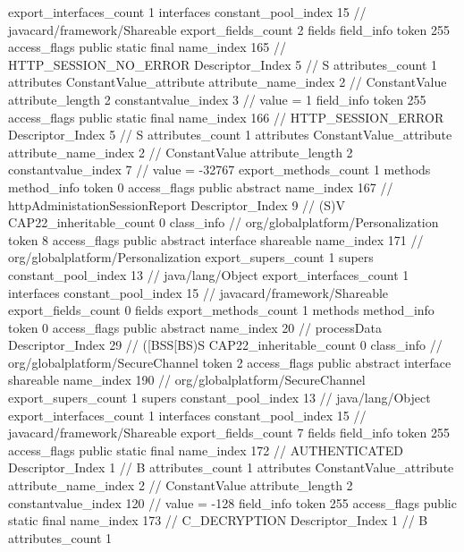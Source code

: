 {{{{			}
			export_interfaces_count	1
			interfaces {
				constant_pool_index	15		// javacard/framework/Shareable
			}
			export_fields_count	2
			fields {
			field_info {
				token	255
				access_flags	public static final
				name_index	165		// HTTP_SESSION_NO_ERROR
				Descriptor_Index	5		// S
				attributes_count	1
				attributes {
				ConstantValue_attribute {
					attribute_name_index	2		// ConstantValue
					attribute_length	2
					constantvalue_index	3		// value = 1
				}
				}
			}
			field_info {
				token	255
				access_flags	public static final
				name_index	166		// HTTP_SESSION_ERROR
				Descriptor_Index	5		// S
				attributes_count	1
				attributes {
				ConstantValue_attribute {
					attribute_name_index	2		// ConstantValue
					attribute_length	2
					constantvalue_index	7		// value = -32767
				}
				}
			}
			}
			export_methods_count	1
			methods {
				method_info {
					token	0
					access_flags	public abstract
					name_index	167		// httpAdministationSessionReport
					Descriptor_Index	9		// (S)V
				}
			}
			CAP22_inheritable_count	0
		}
		class_info {		// org/globalplatform/Personalization
			token	8
			access_flags	public abstract interface shareable
			name_index	171		// org/globalplatform/Personalization
			export_supers_count	1
			supers {
				constant_pool_index	13		// java/lang/Object
			}
			export_interfaces_count	1
			interfaces {
				constant_pool_index	15		// javacard/framework/Shareable
			}
			export_fields_count	0
			fields {
			}
			export_methods_count	1
			methods {
				method_info {
					token	0
					access_flags	public abstract
					name_index	20		// processData
					Descriptor_Index	29		// ([BSS[BS)S
				}
			}
			CAP22_inheritable_count	0
		}
		class_info {		// org/globalplatform/SecureChannel
			token	2
			access_flags	public abstract interface shareable
			name_index	190		// org/globalplatform/SecureChannel
			export_supers_count	1
			supers {
				constant_pool_index	13		// java/lang/Object
			}
			export_interfaces_count	1
			interfaces {
				constant_pool_index	15		// javacard/framework/Shareable
			}
			export_fields_count	7
			fields {
			field_info {
				token	255
				access_flags	public static final
				name_index	172		// AUTHENTICATED
				Descriptor_Index	1		// B
				attributes_count	1
				attributes {
				ConstantValue_attribute {
					attribute_name_index	2		// ConstantValue
					attribute_length	2
					constantvalue_index	120		// value = -128
				}
				}
			}
			field_info {
				token	255
				access_flags	public static final
				name_index	173		// C_DECRYPTION
				Descriptor_Index	1		// B
				attributes_count	1
}}}}}
